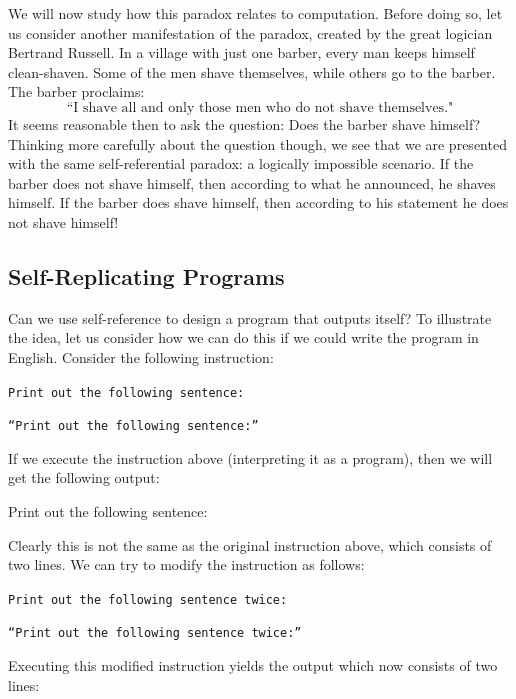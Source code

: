 \documentclass[11pt,fleqn]{article}
\begin{document}
We will now study how this paradox relates to computation.  Before doing so,
let us consider another manifestation of the paradox, created by the great logician
Bertrand Russell. In a village with just one barber, every man keeps himself clean-shaven.
Some of the men shave themselves, while others go to the barber. The barber proclaims:
\vspace{-3pt}
$$\text{``I shave all and only those men who do not shave themselves."}$$
It seems reasonable then to ask the question: Does the barber shave himself? Thinking more carefully about the question though, we see that we are presented with the same self-referential paradox: a logically impossible scenario. If the barber does not shave himself, then according to what he announced, he shaves himself. If the barber
does shave himself, then according to his statement he does not shave himself!



\subsection*{Self-Replicating Programs}

Can we use self-reference to design a program that outputs itself? To illustrate the idea, let us consider how we can do this if we could write the program in English. Consider the following instruction:

\hspace{.3in}\texttt{Print out the following sentence:}

\hspace{.6in}\texttt{``Print out the following sentence:''}

If we execute the instruction above (interpreting it as a program), then we will get the following output:

\hspace{.6in}\textsf{Print out the following sentence:}

Clearly this is not the same as the original instruction above, which consists of two lines. We can try to modify the instruction as follows:

\hspace{.3in}\texttt{Print out the following sentence twice:}

\hspace{.6in}\texttt{``Print out the following sentence twice:''}

Executing this modified instruction yields the output which now consists of two lines:
\end{document}
